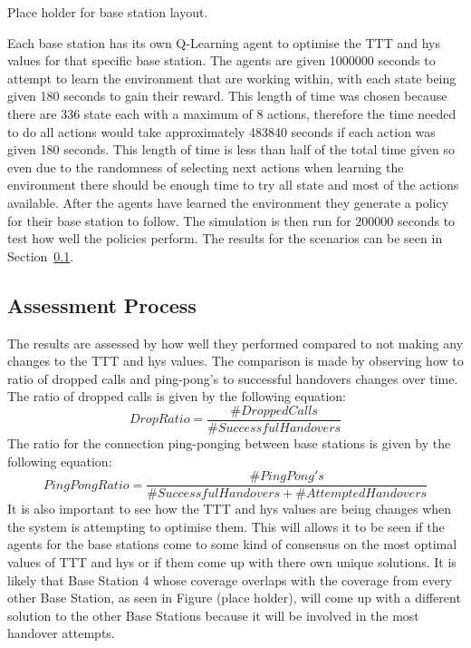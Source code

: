 Place holder for base station layout.

Each base station has its own Q-Learning agent to optimise the TTT and hys values for that specific base station. The agents are given 1000000 seconds to attempt to learn the environment that are working within, with each state being given 180 seconds to gain their reward. This length of time was chosen because there are 336 state each with a maximum of 8 actions, therefore the time needed to do all actions would take approximately 483840 seconds if each action was given 180 seconds. This length of time is less than half of the total time given so even due to the randomness of selecting next actions when learning the environment there should be enough time to try all state and most of the actions available. After the agents have learned the environment they generate a policy for their base station to follow. The simulation is then run for 200000 seconds to test how well the policies perform. The results for the scenarios can be seen in Section~\ref{results}.
\subsection{Assessment Process}\label{results}
The results are assessed by how well they performed compared to not making any changes to the TTT and hys values. The comparison is made by observing how to ratio of dropped calls and ping-pong's to successful handovers changes over time. The ratio of dropped calls is given by the following equation:
\begin{equation}\label{eq:drop}
Drop Ratio = \frac{\#Dropped Calls}{\#Successful Handovers}
\end{equation}
The ratio for the connection ping-ponging between base stations is given by the following equation:
\begin{equation}\label{eq:ping}
PingPong Ratio = \frac{\#PingPong's}{\#Successful Handovers + \#Attempted Handovers}
\end{equation}
It is also important to see how the TTT and hys values are being changes when the system is attempting to optimise them. This will allows it to be seen if the agents for the base stations come to some kind of consensus on the most optimal values of TTT and hys or if them come up with there own unique solutions. It is likely that Base Station 4 whose coverage overlaps with the coverage from every other Base Station, as seen in Figure (place holder), will come up with a different solution to the other Base Stations because it will be involved in the most handover attempts.

